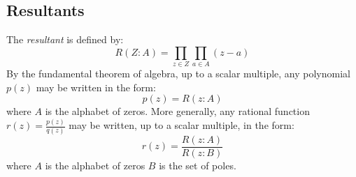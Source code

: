 \documentclass[12pt,dvips]{amsart}
\begin{document}


\bigskip\bigskip
\subsection{Resultants}\label{resultants} \label{theta}

\medskip
\noindent
The {\it resultant} is defined by:
$$ R(Z : A) = \prod_{z \in Z} \prod_{a \in A} (z - a)$$
By the fundamental theorem of algebra, up to a scalar multiple, any polynomial $p(z)$ may be written in the form:
$$p(z) = R(z :A)$$
where $A$ is the alphabet of zeros. More generally, any rational function $r(z) = \frac{p(z)}{q(z)}$ may be written, up to a scalar multiple, in the form:
$$ r(z) = \frac{R(z:A)}{R(z : B)}$$
where $A$ is the alphabet of zeros $B$ is the set of poles. 
\end{document}
